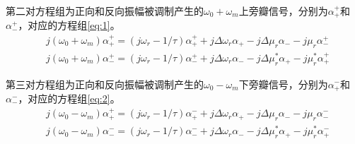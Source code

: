 第二对方程组为正向和反向振幅被调制产生的$\omega_0+\omega_m$上旁瓣信号，分别为$\alpha_+^+$和$\alpha_-^+$，对应的方程组\ref{eq:1}。
\begin{subequations}  \label{eq:1}
	\begin{align}  
	&j(\omega_0+\omega_m)\alpha_+^+ = (j\omega_r-1/\tau)\alpha_+^+ +j\Delta \omega_r\alpha_+ - j\Delta \mu_r\alpha_- - j\mu_r\alpha_-^+            \label{eq:1A} \\
	&j(\omega_0+\omega_m)\alpha_-^+ = (j\omega_r-1/\tau)\alpha_-^+ +j\Delta \omega_r\alpha_- - j\Delta \mu_r^*\alpha_+ - j\mu_r^*\alpha_+^+           \label{eq:1B}
	\end{align}
\end{subequations}

第三对方程组为正向和反向振幅被调制产生的$\omega_0-\omega_m$下旁瓣信号，分别为$\alpha_+^-$和$\alpha_-^-$，对应的方程组\ref{eq:2}。
\begin{subequations}  \label{eq:2}
	\begin{align}  
	&j(\omega_0-\omega_m)\alpha_+^+ = (j\omega_r-1/\tau)\alpha_+^- +j\Delta \omega_r\alpha_+ - j\Delta \mu_r\alpha_- - j\mu_r\alpha_-^-            \label{eq:2A} \\
	&j(\omega_0-\omega_m)\alpha_-^- = (j\omega_r-1/\tau)\alpha_-^- +j\Delta \omega_r\alpha_- - j\Delta \mu_r^*\alpha_+ - j\mu_r^*\alpha_+^-           \label{eq:2B}
	\end{align}
\end{subequations}

